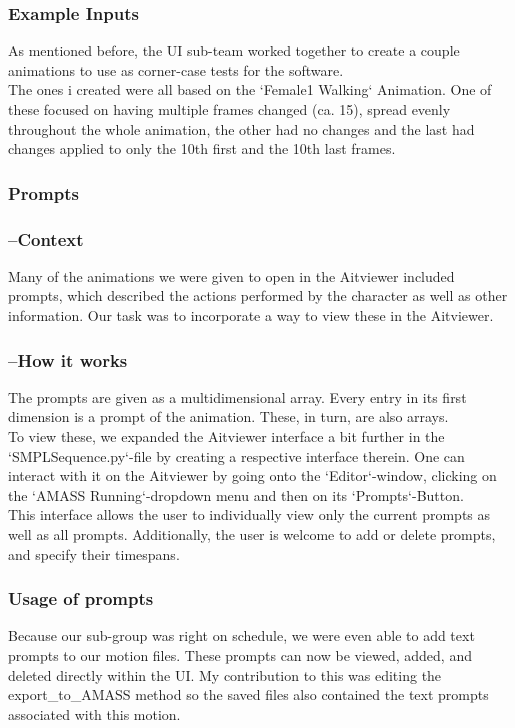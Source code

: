 \documentclass[a4paper]{scrartcl}
\begin{document}
\subsubsection*{Example Inputs}
As mentioned before, the UI sub-team worked together to create a couple animations to use as corner-case tests for the software.\\
The ones i created were all based on the `Female1 Walking` Animation. One of these focused on having multiple frames changed (ca. 15), spread evenly throughout the whole animation, the other had no changes and the last had changes applied to only the 10th first and the 10th last frames.

\subsubsection*{Prompts}
\subsubsection*{--Context}
Many of the animations we were given to open in the Aitviewer included prompts, which described the actions performed by the character as well as other information. Our task was to incorporate a way to view these in the Aitviewer.

\subsubsection*{--How it works}
The prompts are given as a multidimensional array. Every entry in its first dimension is a prompt of the animation. These, in turn, are also arrays.\\
To view these, we expanded the Aitviewer interface a bit further in the `SMPLSequence.py`-file by creating a respective interface therein. One can interact with it on the Aitviewer by going onto the `Editor`-window, clicking on the `AMASS Running`-dropdown menu and then on its `Prompts`-Button.\\
This interface allows the user to individually view only the current prompts as well as all prompts. Additionally, the user is welcome to add or delete prompts, and specify their timespans.

\subsubsection*{Usage of prompts}
Because our sub-group was right on schedule, we were even able to add text prompts to our motion files. These prompts can now be viewed, added, and deleted directly within the UI. My contribution to this was editing the export\_to\_AMASS method so the saved files also contained the text prompts associated with this motion.
\end{document}
